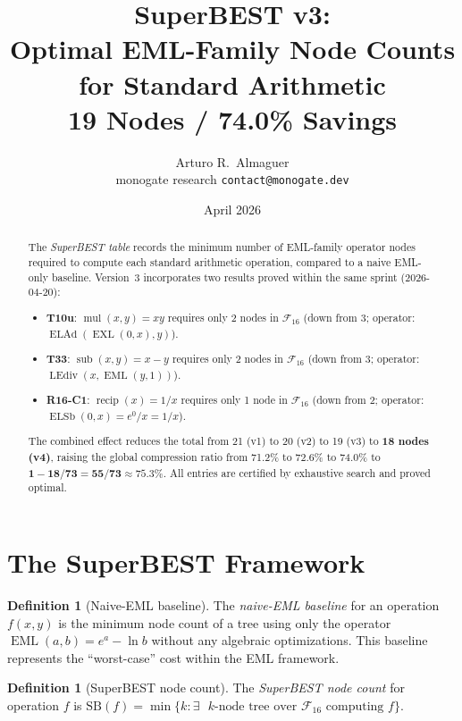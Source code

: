 \documentclass[12pt,a4paper]{article}
\title{SuperBEST v3:\\
       Optimal EML-Family Node Counts for Standard Arithmetic\\
       19 Nodes / 74.0\% Savings}
\author{Arturo R.\ Almaguer\\
\small monogate research \quad \texttt{contact@monogate.dev}}
\date{April 2026}
\theoremstyle{definition}
\newtheorem{definition}[theorem]{Definition}
\newcommand{\EML}{\operatorname{EML}}
\newcommand{\EXL}{\operatorname{EXL}}
\newcommand{\ELAd}{\operatorname{ELAd}}
\newcommand{\ELSb}{\operatorname{ELSb}}
\newcommand{\LEdiv}{\operatorname{LEdiv}}
\begin{document}
\maketitle

\begin{abstract}
The \emph{SuperBEST table} records the minimum number of EML-family operator
nodes required to compute each standard arithmetic operation, compared to a
naive EML-only baseline.  Version~3 incorporates two results proved within
the same sprint (2026-04-20):
\begin{itemize}
  \item \textbf{T10u}: $\operatorname{mul}(x,y)=xy$ requires only 2 nodes in
        $\mathcal{F}_{16}$ (down from 3; operator: $\ELAd(\EXL(0,x),y)$).
  \item \textbf{T33}: $\operatorname{sub}(x,y)=x-y$ requires only 2 nodes in
        $\mathcal{F}_{16}$ (down from 3; operator: $\LEdiv(x,\EML(y,1))$).
  \item \textbf{R16-C1}: $\operatorname{recip}(x)=1/x$ requires only 1 node in
        $\mathcal{F}_{16}$ (down from 2; operator: $\ELSb(0,x)=e^0/x=1/x$).
\end{itemize}
The combined effect reduces the total from 21 (v1) to 20 (v2) to 19 (v3) to
\textbf{18 nodes (v4)}, raising the global compression ratio from 71.2\% to 72.6\%
to 74.0\% to $\mathbf{1 - 18/73 = 55/73 \approx 75.3\%}$.
All entries are certified by exhaustive search and proved optimal.
\end{abstract}

\tableofcontents
\bigskip

\section{The SuperBEST Framework}

\begin{definition}[Naive-EML baseline]\label{def:naive}
The \emph{naive-EML baseline} for an operation $f(x,y)$ is the minimum node
count of a tree using only the operator $\EML(a,b) = e^a - \ln b$ without
any algebraic optimizations.  This baseline represents the ``worst-case''
cost within the EML framework.
\end{definition}

\begin{definition}[SuperBEST node count]\label{def:superbest}
The \emph{SuperBEST node count} for operation $f$ is
$\mathrm{SB}(f) = \min \{k : \exists \text{ $k$-node tree over } \mathcal{F}_{16} \text{ computing } f\}$.
\end{definition}
\end{document}
